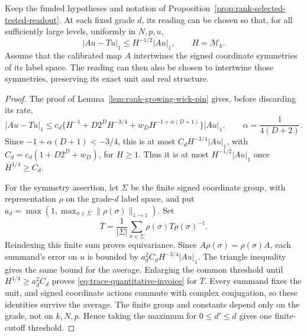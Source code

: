 \begin{lemma}
\label{lem:trace-quantitative-invoice}
Keep the funded hypotheses and notation of
Proposition~\ref{prop:rank-selected-tested-readout}. At each fixed grade
$d$, its reading can be chosen so that, for all sufficiently large levels,
uniformly in $N,p,u$,
\begin{equation}\label{eq:trace-quantitative-invoice}
 |Au-Tu|_1\le H^{-1/2}|Au|_1,\qquad H=\mathcal M_k.
\end{equation}
Assume that the calibrated map $A$ intertwines the signed coordinate
symmetries of its label space. The reading can then also be chosen to
intertwine those symmetries, preserving its exact unit and real structure.
\end{lemma}
\begin{proof}
The proof of Lemma~\ref{lem:rank-growing-wick-pin} gives, before discarding
its rate,
\[
 |Au-Tu|_1\le c_d\{H^{-1}+D2^DH^{-3/4}
                 +w_DH^{-1+\alpha(D+1)}\}|Au|_1,
 \qquad \alpha=\frac1{4(D+2)}.
\]
Since $-1+\alpha(D+1)<-3/4$, this is at most
$C_dH^{-3/4}|Au|_1$, with
$C_d=c_d(1+D2^D+w_D)$, for $H\ge1$. Thus it is at most
$H^{-1/2}|Au|_1$ once $H^{1/4}\ge C_d$.

For the symmetry assertion, let $\Sigma$ be the finite signed coordinate
group, with representation $\rho$ on the grade-$d$ label space, and put
$a_d=\max(1,\max_{\sigma\in\Sigma}\|\rho(\sigma)\|_{1\to1})$.
Set
\[
 \overline T=\frac1{|\Sigma|}\sum_{\sigma\in\Sigma}
                \rho(\sigma)T\rho(\sigma)^{-1}.
\]
Reindexing this finite sum proves equivariance. Since $A\rho(\sigma)
=\rho(\sigma)A$, each summand's error on $u$ is bounded by
$a_d^2 C_dH^{-3/4}|Au|_1$. The triangle inequality gives the same bound
for the average. Enlarging the common threshold until
$H^{1/4}\ge a_d^2C_d$ proves \eqref{eq:trace-quantitative-invoice}
for $\overline T$. Every summand fixes the unit, and signed coordinate
actions commute with complex conjugation, so these identities survive
the average. The finite group and constants depend only on the grade,
not on $k,N,p$. Hence taking the maximum for $0\le d'\le d$ gives
one finite-cutoff threshold.
\end{proof}

